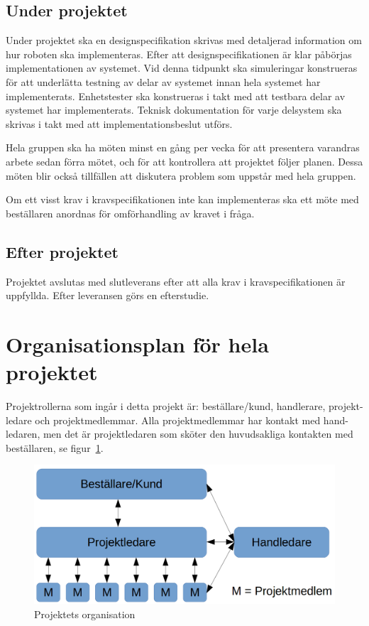 \documentclass[a4paper,titlepage,12pt]{article}
\begin{document}
	\subsection{Under projektet}
	Under projektet ska en designspecifikation skrivas med detaljerad
	information om hur roboten ska implementeras. Efter att
	designspecifikationen är klar påbörjas implementationen av systemet. Vid
    denna tidpunkt ska simuleringar konstrueras för att underlätta testning av
    delar av systemet innan hela systemet har implementerats.
	Enhetstester ska konstrueras i takt med att testbara delar av systemet har
	implementerats. Teknisk dokumentation för varje delsystem ska skrivas
	i takt med att implementationsbeslut utförs.

	Hela gruppen ska ha möten minst en gång per vecka för att presentera
	varandras arbete sedan förra mötet, och för att kontrollera att projektet
	följer planen. Dessa möten blir också tillfällen att diskutera problem som
	uppstår med hela gruppen.

	Om ett visst krav i kravspecifikationen inte kan implementeras ska ett möte
	med beställaren anordnas för omförhandling av kravet i fråga.
	
	\subsection{Efter projektet}
	Projektet avslutas med slutleverans efter att alla krav i
	kravspecifikationen är uppfyllda. Efter leveransen görs en efterstudie.
	
	
	\section{Organisationsplan för hela projektet}
	Projektrollerna som ingår i detta projekt är: beställare/kund, handlerare,
	projekt-ledare och projektmedlemmar. Alla projektmedlemmar har kontakt med
	hand-ledaren, men det är projektledaren som sköter den huvudsakliga
	kontakten med beställaren, se figur~\ref{fig:organization}.

	\begin{figure}[h!]
		\begin{center}
		\includegraphics[width=0.8\linewidth]{images/projectroles.png}
		\caption{Projektets organisation\label{fig:organization}}
		\end{center}
	\end{figure}
	 
\end{document}
